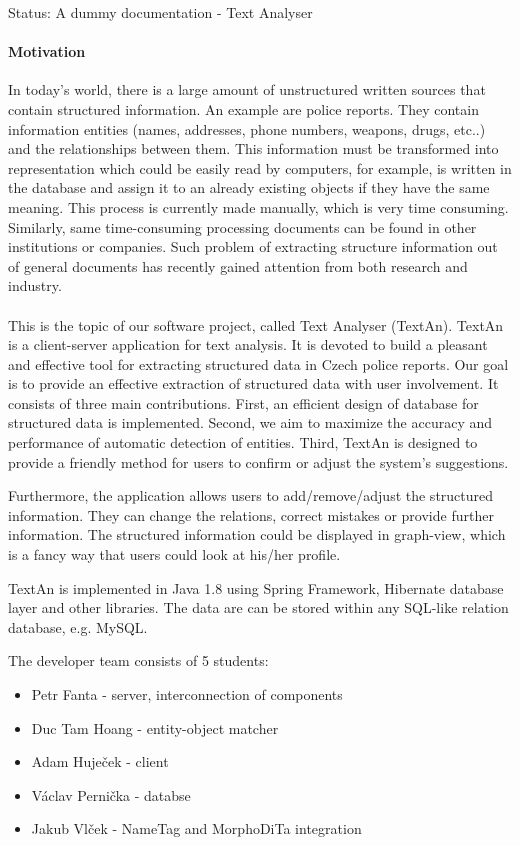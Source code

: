 Status: A dummy documentation - Text Analyser



\paragraph{Motivation} In today's world, there is a large amount of unstructured written sources that contain structured information. An example are police reports. They contain information entities (names, addresses, phone numbers, weapons, drugs, etc..) and the relationships between them. This information must be transformed into representation which could be easily read by computers, for example, is written in the database and assign it to an already existing objects if they have the same meaning. This process is currently made manually, which is very time consuming. Similarly, same time-consuming processing documents can be found in other institutions or companies. Such problem of extracting structure information out of general documents has recently gained attention from both research and industry.\\
\\
This is the topic of our software project, called Text Analyser (TextAn).
TextAn is a client-server application for text analysis.
It is devoted to build a pleasant and effective tool for extracting structured data in Czech police reports. 
Our goal is to provide an effective extraction of structured data with user involvement.
It consists of three main contributions.
First, an efficient design of database for structured data is implemented.
Second, we aim to maximize the accuracy and performance of automatic detection of entities.
Third, TextAn is designed to provide a friendly method for users to confirm or adjust the system's suggestions.

Furthermore, the application allows users to add/remove/adjust the structured information.
They can change the relations, correct mistakes or provide further information.
The structured information could be displayed in graph-view,
which is a fancy way that users could look at his/her profile. 

TextAn is implemented in Java 1.8 using Spring Framework, Hibernate database layer and other libraries.
The data are can be stored within any SQL-like relation database, e.g. MySQL.

The developer team consists of 5 students:

\begin{itemize}
\itemsep0em
\item Petr Fanta - server, interconnection of components
\item Duc Tam Hoang - entity-object matcher 
\item Adam Huječek - client
\item Václav Pernička - databse
\item Jakub Vlček - NameTag and MorphoDiTa integration
\end{itemize}
